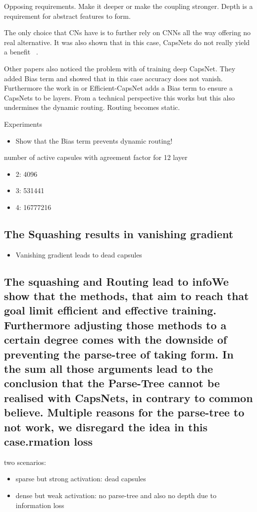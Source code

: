 \documentclass{article}
\begin{document}
Opposing requirements. Make it deeper or make the coupling stronger.
Depth is a requirement for abstract features to form.

The only choice that CNs have is to further rely on CNNs all the way offering no real alternative.
It was also shown that in this case, CapsNets do not really yield a benefit ~\cite{acml/PaikKK19}.

Other papers also noticed the problem with of training deep CapsNet. They added Bias term and showed that in this case accuracy does not vanish.
Furthermore the work in \cite{prl/PeerSR21} or Efficient-CapsNet adds a Bias term to ensure a CapsNets to be layers.
From a technical perspective this works but this also undermines the dynamic routing.
Routing becomes static.

Experiments
\begin{itemize}
	\item Show that the Bias term prevents dynamic routing!
\end{itemize}

number of active capsules with agreement factor for 12 layer
\begin{itemize}
	\item 2: 4096
	\item 3: 531441
	\item 4: 16777216
\end{itemize}

\subsection{The Squashing results in vanishing gradient}
\begin{itemize}
	\item Vanishing gradient leads to dead capsules
\end{itemize}
\subsection{The squashing and Routing lead to infoWe show that the methods, that aim to reach that goal limit efficient and effective training.
	Furthermore adjusting those methods to a certain degree comes with the downside of preventing the parse-tree of taking form.
	In the sum all those arguments lead to the conclusion that the Parse-Tree cannot be realised with CapsNets, in contrary to common believe.
	Multiple reasons for the parse-tree to not work, we disregard the idea in this case.rmation loss}
two scenarios:
\begin{itemize}
	\item sparse but strong activation: dead capsules
	\item dense but weak activation: no parse-tree and also no depth due to information loss
\end{itemize}
\end{document}
